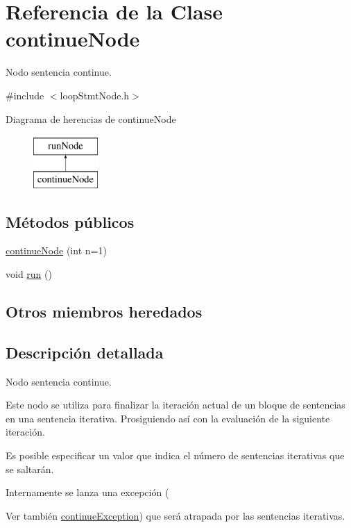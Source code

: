 \hypertarget{classcontinueNode}{\section{Referencia de la Clase continue\-Node}
\label{classcontinueNode}
}


Nodo sentencia continue.  




{\ttfamily \#include $<$loop\-Stmt\-Node.\-h$>$}

Diagrama de herencias de continue\-Node\begin{figure}[H]
\begin{center}
\leavevmode
\includegraphics[height=2.000000cm]{classcontinueNode}
\end{center}
\end{figure}
\subsection*{Métodos públicos}
\begin{DoxyCompactItemize}
\item 
\hyperlink{classcontinueNode_ace21e3368be1423dbe879546c61f25f2}{continue\-Node} (int n=1)
\item 
void \hyperlink{classcontinueNode_afef4eca9866bfb614c779a5c9b02adc1}{run} ()
\end{DoxyCompactItemize}
\subsection*{Otros miembros heredados}


\subsection{Descripción detallada}
Nodo sentencia continue. 

Este nodo se utiliza para finalizar la iteración actual de un bloque de sentencias en una sentencia iterativa. Prosiguiendo así con la evaluación de la siguiente iteración.

Es posible especificar un valor que indica el número de sentencias iterativas que se saltarán.

Internamente se lanza una excepción (\begin{DoxySeeAlso}{Ver también}
\hyperlink{classcontinueException}{continue\-Exception}) que será atrapada por las sentencias iterativas. 
\end{DoxySeeAlso}


